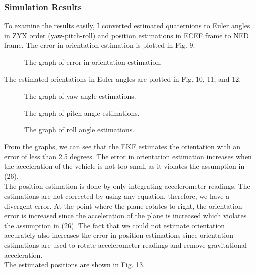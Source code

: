 \documentclass[12pt]{article}
\begin{document}
    
    \subsubsection{Simulation Results}
    To examine the results easily, I converted estimated quaternions 
    to Euler angles in ZYX order (yaw-pitch-roll) and position estimations 
    in ECEF frame to NED frame. The error in orientation estimation is 
    plotted in Fig. 9. \\

    \begin{figure}[H]
        \centerline{}
        \caption{The graph of error in orientation estimation.}
    \end{figure}
    The estimated orientations in Euler angles are plotted in Fig. 10, 11, and 12.
    \begin{figure}[H]
        \centerline{}
        \caption{The graph of yaw angle estimations.}
    \end{figure}
    \begin{figure}[H]
        \centerline{}
        \caption{The graph of pitch angle estimations.}
    \end{figure}
    \begin{figure}[H]
        \centerline{}
        \caption{The graph of roll angle estimations.}
    \end{figure}

    From the graphs, we can see that the EKF estimates the orientation 
    with an error of less than 2.5 degrees. The error in orientation estimation 
    increases when the acceleration of the vehicle is not too small as 
    it violates the assumption in (26).\\
    The position estimation is done by only integrating accelerometer 
    readings. The estimations are not corrected by using any equation, 
    therefore, we have a divergent error. At the point where the plane 
    rotates to right, the orientation error is increased since the acceleration 
    of the plane is increased which violates the assumption in (26).
    The fact that we could not estimate orientation accurately also increases 
    the error in position estimations since orientation estimations are used to rotate 
    accelerometer readings and remove gravitational acceleration.\\
    The estimated positions are shown in Fig. 13.
\end{document}
